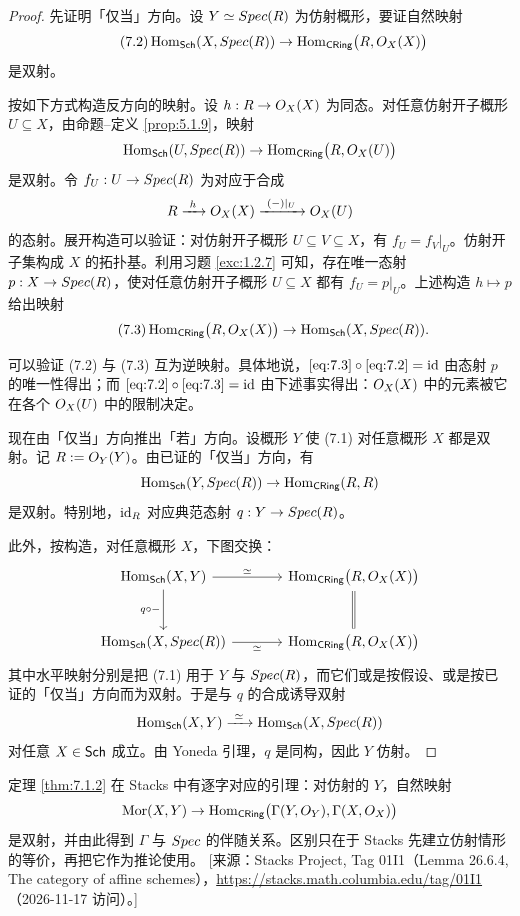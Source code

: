 \begin{proof}
先证明「仅当」方向。设 $Y\simeq Spec(R)$ 为仿射概形，要证自然映射
\begin{equation}\tag{7.2}\label{eq:7.2}
\operatorname{Hom}_{\mathsf{Sch}}(X,Spec(R))\to\operatorname{Hom}_{\mathsf{CRing}}\bigl(R,O_X(X)\bigr)
\end{equation}
是双射。

按如下方式构造反方向的映射。设 $h:R\to O_X(X)$ 为同态。对任意仿射开子概形 $U\subseteq X$，由命题--定义 \ref{prop:5.1.9}，映射
\[
\operatorname{Hom}_{\mathsf{Sch}}(U,Spec(R))\to\operatorname{Hom}_{\mathsf{CRing}}\bigl(R,O_X(U)\bigr)
\]
是双射。令 $f_U:U\to Spec(R)$ 为对应于合成
\[
R\xrightarrow{\ h\ }\cO_X(X)\xrightarrow{\ (-)|_U\ }\cO_X(U)
\]
的态射。展开构造可以验证：对仿射开子概形 $U\subseteq V\subseteq X$，有 $f_U=f_V|_U$。仿射开子集构成 $X$ 的拓扑基。利用习题 \ref{exc:1.2.7} 可知，存在唯一态射 $p:X\to Spec(R)$，使对任意仿射开子概形 $U\subseteq X$ 都有 $f_U=p|_U$。上述构造 $h\mapsto p$ 给出映射
\begin{equation}\tag{7.3}\label{eq:7.3}
\operatorname{Hom}_{\mathsf{CRing}}\bigl(R,O_X(X)\bigr)\to\operatorname{Hom}_{\mathsf{Sch}}(X,Spec(R)).
\end{equation}

可以验证 (7.2) 与 (7.3) 互为逆映射。具体地说，$\eqref{eq:7.3}\circ\eqref{eq:7.2}=\operatorname{id}$ 由态射 $p$ 的唯一性得出；而 $\eqref{eq:7.2}\circ\eqref{eq:7.3}=\operatorname{id}$ 由下述事实得出：$O_X(X)$ 中的元素被它在各个 $O_X(U)$ 中的限制决定。

现在由「仅当」方向推出「若」方向。设概形 $Y$ 使 (7.1) 对任意概形 $X$ 都是双射。记 $R:=O_Y(Y)$。由已证的「仅当」方向，有
\[
\operatorname{Hom}_{\mathsf{Sch}}(Y,Spec(R))\to\operatorname{Hom}_{\mathsf{CRing}}(R,R)
\]
是双射。特别地，$\operatorname{id}_R$ 对应典范态射 $q:Y\to Spec(R)$。

此外，按构造，对任意概形 $X$，下图交换：
\[
\begin{tikzcd}[column sep=large,row sep=large]
\Hom_{\Sch}(X,Y)\arrow[r,"\simeq"]\arrow[d,"q\circ-"'] & \Hom_{\CRing}\bigl(R,\cO_X(X)\bigr)\arrow[d,equal]\\
\Hom_{\Sch}(X,\Spec(R))\arrow[r,"\simeq"'] & \Hom_{\CRing}\bigl(R,\cO_X(X)\bigr)
\end{tikzcd}
\]
其中水平映射分别是把 (7.1) 用于 $Y$ 与 $Spec(R)$，而它们或是按假设、或是按已证的「仅当」方向而为双射。于是与 $q$ 的合成诱导双射
\[
\Hom_{\Sch}(X,Y)\xrightarrow{\ \simeq\ }\Hom_{\Sch}(X,\Spec(R))
\]
对任意 $X\in\mathsf{Sch}$ 成立。由 Yoneda 引理，$q$ 是同构，因此 $Y$ 仿射。
\end{proof}

\begin{yizhu}
定理 \ref{thm:7.1.2} 在 Stacks 中有逐字对应的引理：对仿射的 $Y$，自然映射
\[
\operatorname{Mor}(X,Y)\to\operatorname{Hom}_{\mathsf{CRing}}\bigl(\Gamma(Y,O_Y),\Gamma(X,O_X)\bigr)
\]
是双射，并由此得到 $\Gamma$ 与 $Spec$ 的伴随关系。区别只在于 Stacks 先建立仿射情形的等价，再把它作为推论使用。
[来源：Stacks Project, Tag 01I1（Lemma 26.6.4, The category of affine schemes），\url{https://stacks.math.columbia.edu/tag/01I1}（2026-11-17 访问）。]
\end{yizhu}

